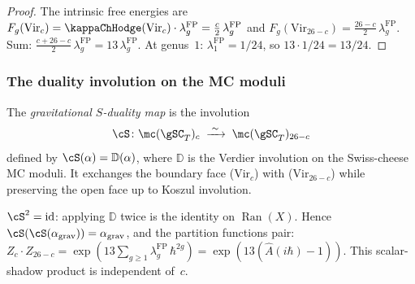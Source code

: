 \begin{proof}
The intrinsic free energies are
$F_g(\mathrm{Vir}_c)
= \kappaChHodge(\mathrm{Vir}_c) \cdot \lambda_g^{\mathrm{FP}}
= \frac{c}{2}\,\lambda_g^{\mathrm{FP}}$ and
$F_g(\mathrm{Vir}_{26-c})
= \frac{26-c}{2}\,\lambda_g^{\mathrm{FP}}$.
Sum: $\frac{c + 26 - c}{2}\,\lambda_g^{\mathrm{FP}}
= 13\,\lambda_g^{\mathrm{FP}}$.
At genus~$1$: $\lambda_1^{\mathrm{FP}} = 1/24$, so
$13 \cdot 1/24 = 13/24$.
\end{proof}

\subsubsection*{The duality involution on the MC moduli}

\begin{definition}
\label{def:gravity-s-duality-map}
The \emph{gravitational $S$-duality map} is the involution
\[
\cS \colon
\mc(\gSC_T)_c
\;\xrightarrow{\;\sim\;}\;
\mc(\gSC_T)_{26-c}
\]
defined by $\cS(\alpha) = \mathbb{D}(\alpha)$, where $\mathbb{D}$
is the Verdier involution on the Swiss-cheese MC moduli. It
exchanges the boundary face ($\mathrm{Vir}_c$) with
($\mathrm{Vir}_{26-c}$) while preserving the open face up to
Koszul involution.
\end{definition}

\begin{remark}
\label{rem:gravity-s-duality-order-two}
$\cS^2 = \mathrm{id}$: applying $\mathbb{D}$ twice is the
identity on $\operatorname{Ran}(X)$. Hence
$\cS(\cS(\alpha_{\mathrm{grav}}))
= \alpha_{\mathrm{grav}}$, and the partition functions pair:
$Z_c \cdot Z_{26-c}
= \exp\!\left(13\sum_{g \ge 1}\lambda_g^{\mathrm{FP}}\,\hbar^{2g}\right)
= \exp\!\left(13(\hat A(i\hbar) - 1)\right)$.
This scalar-shadow product is independent of~$c$.
\end{remark}

